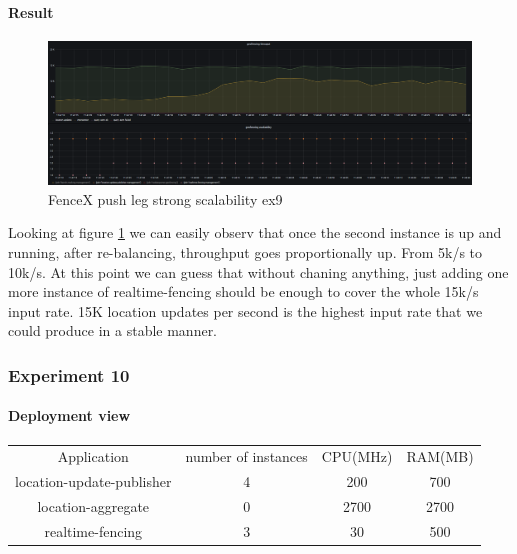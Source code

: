 \documentclass[a4]{report}
\begin{document}
    \paragraph{Result}
    \begin{figure}[ht]
        \caption{FenceX push leg strong scalability ex9}
        \label{fig:ex9}
        \includegraphics[scale=0.4]{images/evaluation/ex9-benchmarking-ongoing-2per4sec.png}
    \end{figure}

    Looking at figure \ref{fig:ex9} we can easily observ that once the second instance is up and running, after
    re-balancing, throughput goes proportionally up.
    From 5k/s to 10k/s.
    At this point we can guess that without chaning anything, just adding one more instance of realtime-fencing
    should be enough to cover the whole 15k/s input rate.
    15K location updates per second is the highest input rate that we could produce in a stable manner.

    \subsubsection{Experiment 10}

    \paragraph{Deployment view}
    \begin{center}
        \begin{tabular}{ c c c c }
            Application               & number of instances & CPU(MHz) & RAM(MB) \\
            location-update-publisher & 4                   & 200      & 700     \\
            location-aggregate        & 0                   & 2700     & 2700    \\
            realtime-fencing          & 3                   & 30       & 500     \\
        \end{tabular}
    \end{center}
\end{document}
